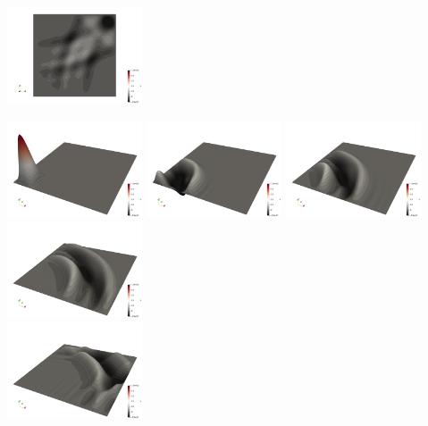 \begin{center}
\includegraphics[width=4cm]{python_codes/fieldstone_165/results2/uu0299.png}
\end{center}

\begin{center}
\includegraphics[width=4cm]{python_codes/fieldstone_165/results2/uuu0000.png}
\includegraphics[width=4cm]{python_codes/fieldstone_165/results2/uuu0050.png}
\includegraphics[width=4cm]{python_codes/fieldstone_165/results2/uuu0100.png}
\includegraphics[width=4cm]{python_codes/fieldstone_165/results2/uuu0150.png}\\
\includegraphics[width=4cm]{python_codes/fieldstone_165/results2/uuu0200.png}

\end{center}
